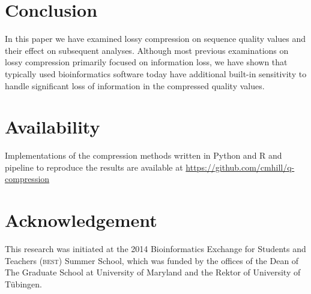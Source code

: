\documentclass{bioinfo}
\begin{document}
%
%

\section{Conclusion}

In this paper we have examined lossy compression on sequence quality
values and their effect on subsequent analyses. Although most previous
examinations on lossy compression primarily focused on information
loss, we have shown that typically used bioinformatics software today
have additional built-in sensitivity to handle significant loss of
information in the compressed quality values.

\section{Availability}
Implementations of the compression methods written in Python and R and pipeline to reproduce the results are available at \url{https://github.com/cmhill/q-compression}

\section*{Acknowledgement}
This research was initiated at the 2014 Bioinformatics Exchange for
Students and Teachers (\textsc{best}) Summer School, which was funded
by the offices of the Dean of The Graduate School at University of
Maryland and the Rektor of University of T\"{u}bingen.






%

%


\end{document}
